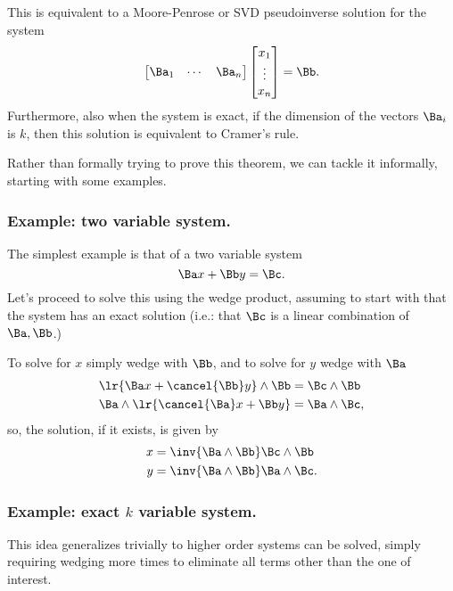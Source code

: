 This is equivalent to a Moore-Penrose or SVD pseudoinverse solution for the system
\begin{equation}\label{eqn:solutionOfLinearSystem:101}
\begin{bmatrix}
\Ba_1 & \cdots & \Ba_n
\end{bmatrix}
\begin{bmatrix}
x_1 \\
\vdots \\
x_n
\end{bmatrix}
=
\Bb.
\end{equation}
Furthermore, also when the system is exact,
if the dimension of the vectors \( \Ba_i \) is \( k \), then this solution is equivalent to Cramer's rule.

Rather than formally trying to prove this theorem, we can tackle it informally, starting with some examples.
\subsubsection{Example: two variable system.}
The simplest example is that of a two variable system
\begin{equation}\label{eqn:solutionOfLinearSystem:1160}
\Ba x + \Bb y = \Bc.
\end{equation}
Let's proceed to solve this using the wedge product, assuming to start with that the system has an exact solution (i.e.: that \( \Bc \) is a linear combination of \( \Ba, \Bb \).)

To solve for \( x \) simply wedge with \( \Bb \), and to solve for \( y \) wedge with \( \Ba \)
\begin{equation}\label{eqn:solutionOfLinearSystem:1180}
\begin{aligned}
\lr{ \Ba x + \cancel{\Bb} y } \wedge \Bb &= \Bc \wedge \Bb \\
\Ba \wedge \lr{ \cancel{\Ba} x + \Bb y } &= \Ba \wedge \Bc,
\end{aligned}
\end{equation}
so, the solution, if it exists, is given by
\begin{equation}\label{eqn:solutionOfLinearSystem:1200}
\begin{aligned}
x &= \inv{ \Ba \wedge \Bb } \Bc \wedge \Bb \\
y &= \inv{ \Ba \wedge \Bb } \Ba \wedge \Bc.
\end{aligned}
\end{equation}
\subsubsection{Example: exact \( k \) variable system.}
This idea generalizes trivially to
higher order systems can be solved, simply requiring wedging more times to eliminate all terms other than the one of interest.


